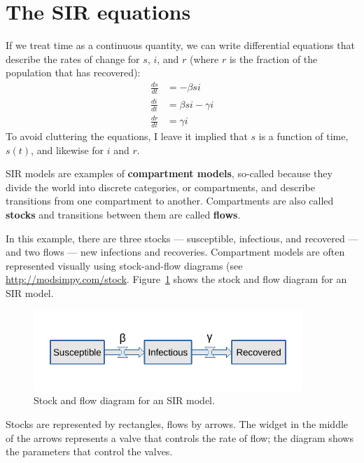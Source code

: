 \documentclass[12pt]{book}
\theoremstyle{exercise}
\begin{document}
\section{The SIR equations}
\label{sireqn}

If we treat time as a continuous quantity, we can write differential equations that describe the rates of change for $s$, $i$, and $r$ (where $r$ is the fraction of the population that has recovered):
%
\begin{align*}
\frac{ds}{dt} &= -\beta s i \\
\frac{di}{dt} &= \beta s i - \gamma i\\
\frac{dr}{dt} &= \gamma i
\end{align*}
%
To avoid cluttering the equations, I leave it implied that $s$ is a function of time, $s(t)$, and likewise for $i$ and $r$.

SIR models are examples of {\bf compartment models}, so-called because they divide the world into discrete categories, or compartments, and describe transitions from one compartment to another.  Compartments are also called {\bf stocks} and transitions between them are called {\bf flows}.


In this example, there are three stocks --- susceptible, infectious, and recovered --- and two flows --- new infections and recoveries.  Compartment models are often represented visually using stock-and-flow diagrams (see \url{http://modsimpy.com/stock}.
Figure~\ref{stock_flow1} shows the stock and flow diagram for an SIR model.

\begin{figure}
\centerline{\includegraphics[width=4in]{figs/stock_flow1.pdf}}
\caption{Stock and flow diagram for an SIR model.}
\label{stock_flow1}
\end{figure}

Stocks are represented by rectangles, flows by arrows.  The widget in the middle of the arrows represents a valve that controls the rate of flow; the diagram shows the parameters that control the valves.
\end{document}
